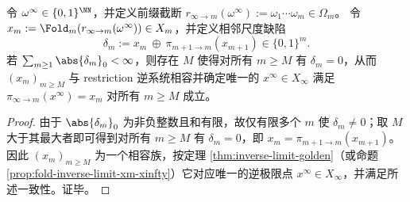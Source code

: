 \begin{proposition}\label{prop:fold-naive-prefix-lift}
令 \(\omega^\infty\in\{0,1\}^{\NN}\)，并定义前缀截断
\(
r_{\infty\to m}(\omega^\infty):=\omega_1\cdots\omega_m\in\Omega_m
\)。
令
\(
x_m:=\Fold_m(r_{\infty\to m}(\omega^\infty))\in X_m
\)，并定义相邻尺度缺陷
\[
\delta_m:=x_m\ \oplus\ \pi_{m+1\to m}(x_{m+1})\in\{0,1\}^m.
\]
若
\(
\sum_{m\ge 1}\abs{\delta_m}_0<\infty
\)，则存在 \(M\) 使得对所有 \(m\ge M\) 有 \(\delta_m=0\)，从而 \((x_m)_{m\ge M}\) 与 restriction 逆系统相容并确定唯一的 \(x^\infty\in X_\infty\) 满足
\(
\pi_{\infty\to m}(x^\infty)=x_m
\)
对所有 \(m\ge M\) 成立。
\end{proposition}

\begin{proof}
由于 \(\abs{\delta_m}_0\) 为非负整数且和有限，故仅有限多个 \(m\) 使 \(\delta_m\neq 0\)；取 \(M\) 大于其最大者即可得到对所有 \(m\ge M\) 有 \(\delta_m=0\)，即 \(x_m=\pi_{m+1\to m}(x_{m+1})\)。
因此 \((x_m)_{m\ge M}\) 为一个相容族，按定理 \ref{thm:inverse-limit-golden}（或命题 \ref{prop:fold-inverse-limit-xm-xinfty}）它对应唯一的逆极限点 \(x^\infty\in X_\infty\)，并满足所述一致性。证毕。
\end{proof}
